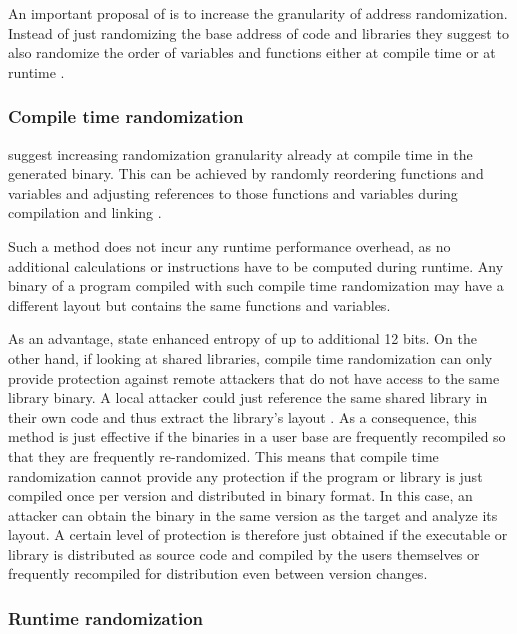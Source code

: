 An important proposal of \citeauthor{Shacham2004} is to increase the granularity of address randomization.
Instead of just randomizing the base address of code and libraries they suggest to also randomize the order of variables and functions either at compile time or at runtime \cite[303\psq]{Shacham2004}.

\subsubsection{Compile time randomization}
\label{subsubsec:randomization-granularity-compile-time}

 suggest increasing randomization granularity already at compile time in the generated binary.
This can be achieved by randomly reordering functions and variables and adjusting references to those functions and variables during compilation and linking \cite[304]{Shacham2004}.

Such a method does not incur any runtime performance overhead, as no additional calculations or instructions have to be computed during runtime.
Any binary of a program compiled with such compile time randomization may have a different layout but contains the same functions and variables.

As an advantage, \citeauthor{Shacham2004} state enhanced entropy of up to additional 12 bits.
On the other hand, if looking at shared libraries, compile time randomization can only provide protection against remote attackers that do not have access to the same library binary.
A local attacker could just reference the same shared library in their own code and thus extract the library's layout \cite[304]{Shacham2004}.
As a consequence, this method is just effective if the binaries in a user base are frequently recompiled so that they are frequently re-randomized.
This means that compile time randomization cannot provide any protection if the program or library is just compiled once per version and distributed in binary format.
In this case, an attacker can obtain the binary in the same version as the target and analyze its layout.
A certain level of protection is therefore just obtained if the executable or library is distributed as source code and compiled by the users themselves or frequently recompiled for distribution even between version changes.

\subsubsection{Runtime randomization}
\label{subsubsec:randomization-granularity-runtime}

